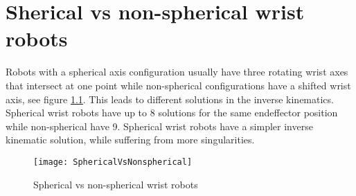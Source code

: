 \chapter{Sherical vs non-spherical wrist robots} \label{sec:SphericalVsNonspherical}

Robots with a spherical axis configuration usually have three rotating wrist axes that intersect at one point while non-spherical configurations have a shifted wrist axis, see figure \ref{fig:SphericalVsNonspherical}.
This leads to different solutions in the inverse kinematics. Spherical wrist robots have up to 8 solutions for the same endeffector position while non-spherical have 9.
Spherical wrist robots have a simpler inverse kinematic solution, while suffering from more singularities. \cite{SphericalNonspherical}



\begin{figure}[H]
	\texttt{[image: SphericalVsNonspherical]}
	\caption{Spherical vs non-spherical wrist robots \cite{SphericalNonspherical}}
	\label{fig:SphericalVsNonspherical}
\end{figure}